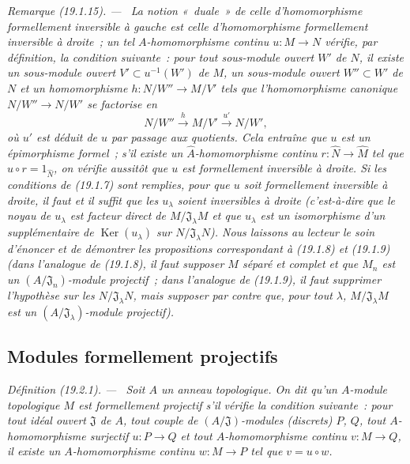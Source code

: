 \documentclass[10pt,oneside]{book}
\makeatletter
\newcommand{\setmanualcurrentlabel}[1]{\def\@currentlabel{#1}}
\newenvironment{definition}[1][]{%
  \setmanualcurrentlabel{#1}\par\medskip\noindent\itshape Définition (#1). ---\ }{\par}
\newenvironment{remark}[1][]{%
  \setmanualcurrentlabel{#1}\par\medskip\noindent\itshape Remarque (#1). ---\ }{\par}
\makeatother
\begin{document}
\begin{remark}[19.1.15]
\label{0.19.1.15-fr}
La notion «~duale~» de celle d'homomorphisme formellement inversible à gauche
est celle d'homomorphisme \emph{formellement inversible à droite}~; un tel
$A$-homomorphisme continu $u:M\to N$ vérifie, par définition, la condition
suivante~: pour tout sous-module ouvert $W'$ de $N$, il existe un sous-module
ouvert $V'\subset u^{-1}(W')$ de $M$, un sous-module ouvert $W''\subset W'$ de
$N$ et un homomorphisme $h:N/W''\to M/V'$ tels que l'homomorphisme canonique
$N/W''\to N/W'$ se factorise en
\[
  N/W''\xrightarrow{h}M/V'\xrightarrow{u'}N/W',
\]
où $u'$ est déduit de $u$ par passage aux quotients. Cela entraîne que $u$ est
un épimorphisme formel~; s'il existe un $\widehat A$-homomorphisme continu
$r:\widehat N\to\widehat M$ tel que $\widehat u\circ r=1_{\widehat N}$, on
vérifie aussitôt que $u$ est formellement inversible à droite. Si les
conditions de (19.1.7) sont remplies, pour que $u$ soit formellement inversible
à droite, il faut et il suffit que les $u_\lambda$ soient inversibles à droite
(c'est-à-dire que le noyau de $u_\lambda$ est facteur direct de
$M/\mathfrak J_\lambda M$ et que $u_\lambda$ est un isomorphisme d'un
supplémentaire de $\operatorname{Ker}(u_\lambda)$ sur
$N/\mathfrak J_\lambda N$). Nous laissons au lecteur le soin d'énoncer et de
démontrer les propositions correspondant à (19.1.8) et (19.1.9) (dans
l'analogue de (19.1.8), il faut supposer $M$ séparé et complet et que $M_n$ est
un $(A/\mathfrak J_n)$-module projectif~; dans l'analogue de (19.1.9), il faut
supprimer l'hypothèse sur les $N/\mathfrak J_\lambda N$, mais supposer par
contre que, pour tout $\lambda$, $M/\mathfrak J_\lambda M$ est un
$(A/\mathfrak J_\lambda)$-module projectif).
\end{remark}

\subsection{Modules formellement projectifs}
\label{subsection:0.19.2-fr}

\begin{definition}[19.2.1]
\label{0.19.2.1-fr}
Soit $A$ un anneau topologique. On dit qu'un $A$-module topologique $M$ est
\emph{formellement projectif} s'il vérifie la condition suivante~: pour tout
idéal ouvert $\mathfrak J$ de $A$, tout couple de $(A/\mathfrak J)$-modules
(discrets) $P$, $Q$, tout $A$-homomorphisme surjectif $u:P\to Q$ et tout
$A$-homomorphisme continu $v:M\to Q$, il existe un $A$-homomorphisme continu
$w:M\to P$ tel que $v=u\circ w$.
\end{definition}
\end{document}
